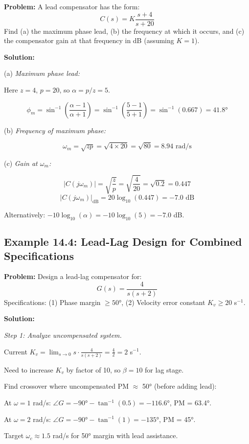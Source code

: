 \textbf{Problem:} A lead compensator has the form:
\[
C(s) = K \frac{s + 4}{s + 20}
\]
Find (a) the maximum phase lead, (b) the frequency at which it occurs, and (c) the compensator gain at that frequency in dB (assuming $K=1$).

\textbf{Solution:}

(a) \textit{Maximum phase lead:}

Here $z = 4$, $p = 20$, so $\alpha = p/z = 5$.

\[
\phi_m = \sin^{-1}\left(\frac{\alpha - 1}{\alpha + 1}\right) = \sin^{-1}\left(\frac{5-1}{5+1}\right) = \sin^{-1}(0.667) = \boxed{41.8°}
\]

(b) \textit{Frequency of maximum phase:}

\[
\omega_m = \sqrt{zp} = \sqrt{4 \times 20} = \sqrt{80} = \boxed{8.94 \text{ rad/s}}
\]

(c) \textit{Gain at $\omega_m$:}

\[
|C(j\omega_m)| = \sqrt{\frac{z}{p}} = \sqrt{\frac{4}{20}} = \sqrt{0.2} = 0.447
\]
\[
|C(j\omega_m)|_{\text{dB}} = 20\log_{10}(0.447) = \boxed{-7.0 \text{ dB}}
\]

Alternatively: $-10\log_{10}(\alpha) = -10\log_{10}(5) = -7.0$ dB.

\subsection{Example 14.4: Lead-Lag Design for Combined Specifications}

\textbf{Problem:} Design a lead-lag compensator for:
\[
G(s) = \frac{4}{s(s+2)}
\]
Specifications: (1) Phase margin $\geq 50°$, (2) Velocity error constant $K_v \geq 20$ s$^{-1}$.

\textbf{Solution:}

\textit{Step 1: Analyze uncompensated system.}

Current $K_v = \lim_{s \to 0} s \cdot \frac{4}{s(s+2)} = \frac{4}{2} = 2$ s$^{-1}$.

Need to increase $K_v$ by factor of 10, so $\beta = 10$ for lag stage.

Find crossover where uncompensated PM $\approx$ 50° (before adding lead):

At $\omega = 1$ rad/s: $\angle G = -90° - \tan^{-1}(0.5) = -116.6°$, PM = 63.4°.

At $\omega = 2$ rad/s: $\angle G = -90° - \tan^{-1}(1) = -135°$, PM = 45°.

Target $\omega_c \approx 1.5$ rad/s for 50° margin with lead assistance.

